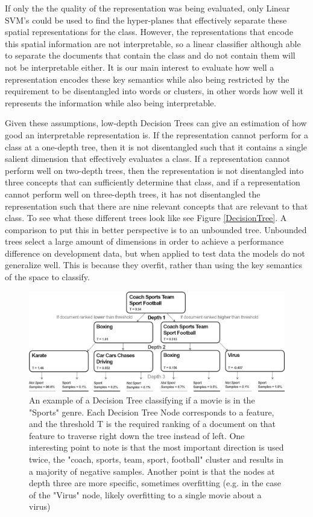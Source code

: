 If only the the quality of the representation was being evaluated, only Linear SVM's could be used to find the hyper-planes that effectively separate these spatial representations for the class. However, the representations that encode this spatial information are not interpretable, so a linear classifier although able to separate the documents that contain the class and do not contain them will not be interpretable either. It is our main interest to evaluate how well a representation encodes these key semantics while also being restricted by the requirement to be disentangled into words or clusters, in other words how well it represents the information while also being interpretable.

Given these assumptions, low-depth Decision Trees can give an estimation of how good an interpretable representation is. If the representation cannot perform for a class at a one-depth tree, then it is not disentangled such that it contains a single salient dimension that effectively evaluates a class. If a representation cannot perform well on two-depth trees, then the representation is not disentangled into three concepts that can sufficiently determine that class, and if a representation cannot perform well on three-depth trees, it has not disentangled the representation such that there are nine relevant concepts that are relevant to that class. To see what these different trees look like see Figure \ref{DecisionTree}. A comparison to put this in better perspective is to an unbounded tree. Unbounded trees select a large amount of dimensions in order to achieve a performance difference on development data, but when applied to test data the models do not generalize well. This is because they overfit, rather than using the key semantics of the space to classify.

\begin{figure}[t]
	\includegraphics[width=450px]{images/decision_tree_ex.png}
	\centering
	\caption{An example of a Decision Tree classifying if a movie is in the "Sports" genre. Each Decision Tree Node corresponds to a feature, and the threshold T is the required ranking of a document on that feature to traverse right down the tree instead of left. One interesting point to note is that the most important direction is used twice, the "coach, sports, team, sport, football" cluster and results in a majority of negative samples. Another point is that the nodes at depth three are more specific, sometimes overfitting (e.g. in the case of the "Virus" node, likely overfitting to a single movie about a virus) }\label{ch3:DecisionTree}
\end{figure}



